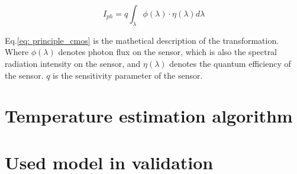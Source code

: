 \begin{equation}
    \label{eq: principle_cmos}
    I_{ph} = q \int_{\lambda}^{} \phi(\lambda) \cdot \eta(\lambda) d\lambda
\end{equation}


Eq.\ref{eq: principle_cmos} is the mathetical description of the 
transformation. Where $\phi(\lambda)$ denotes photon flux on the sensor, 
which is also the spectral radiation intensity on the sensor, and $\eta(\lambda)$
denotes the quantum efficiency of the sensor. $q$ is the sensitivity parameter 
of the sensor.
%
%

\section{Temperature estimation algorithm}


\section{Used model in validation}%

%
%
